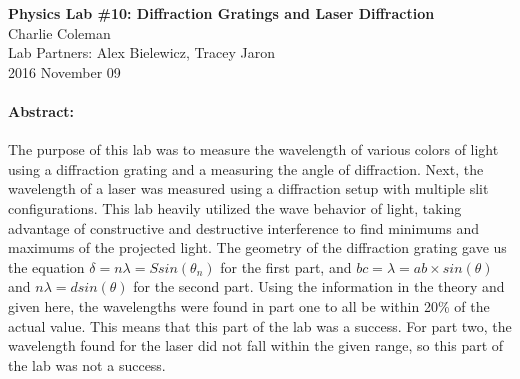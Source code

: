 \documentclass[12pt]{article}
\begin{document}
\begin{center}
\textbf{Physics Lab \#10: Diffraction Gratings and Laser Diffraction}\\
Charlie Coleman\\
Lab Partners: Alex Bielewicz, Tracey Jaron\\
2016 November 09
\end{center}
\paragraph{Abstract:} The purpose of this lab was to measure the wavelength of various colors of light using a diffraction grating and a measuring the angle of diffraction. Next, the wavelength of a laser was measured using a diffraction setup with multiple slit configurations. This lab heavily utilized the wave behavior of light, taking advantage of constructive and destructive interference to find minimums and maximums of the projected light. The geometry of the diffraction grating gave us the equation $\delta = n \lambda = S sin(\theta_n)$ for the first part, and $bc = \lambda = ab \times sin(\theta)$ and $n \lambda = d sin(\theta)$ for the second part. Using the information in the theory and given here, the wavelengths were found in part one to all be within 20\% of the actual value. This means that this part of the lab was a success. For part two, the wavelength found for the laser did not fall within the given range, so this part of the lab was not a success.
\end{document}

